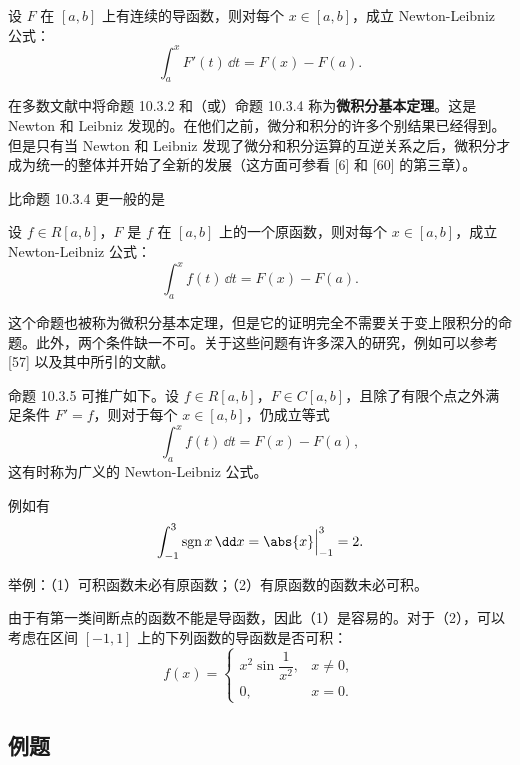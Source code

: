 \begin{xtheorem}[10.3.4（微积分基本公式）]
设 $F$ 在 $[a,b]$ 上有连续的导函数，则对每个 $x\in[a,b]$，成立 Newton-Leibniz 公式：
\[
  \int_a^x F'(t)\,\dd t=F(x)-F(a).
\]
\end{xtheorem}

在多数文献中将命题 10.3.2 和（或）命题 10.3.4 称为\textbf{微积分基本定理}。这是 Newton 和 Leibniz 发现的。在他们之前，微分和积分的许多个别结果已经得到。但是只有当 Newton 和 Leibniz 发现了微分和积分运算的互逆关系之后，微积分才成为统一的整体并开始了全新的发展（这方面可参看 [6] 和 [60] 的第三章）。

比命题 10.3.4 更一般的是

\begin{xtheorem}[10.3.5]
设 $f\in R[a,b]$，$F$ 是 $f$ 在 $[a,b]$ 上的一个原函数，则对每个 $x\in[a,b]$，成立 Newton-Leibniz 公式：
\[
  \int_a^x f(t)\,\dd t=F(x)-F(a).
\]
\end{xtheorem}

\begin{xremark}
这个命题也被称为微积分基本定理，但是它的证明完全不需要关于变上限积分的命题。此外，两个条件缺一不可。关于这些问题有许多深入的研究，例如可以参考 [57] 以及其中所引的文献。
\end{xremark}

\begin{xremark}
命题 10.3.5 可推广如下。设 $f\in R[a,b]$，$F\in C[a,b]$，且除了有限个点之外满足条件 $F'=f$，则对于每个 $x\in[a,b]$，仍成立等式
\[
  \int_a^x f(t)\,\dd t=F(x)-F(a),
\]
这有时称为广义的 Newton-Leibniz 公式。

例如有
\[
  \int_{-1}^3\operatorname{sgn}x\,\dd x=\abs{x}\Big|_{-1}^3=2.
\]
\end{xremark}

\begin{xthought}
举例：（1）可积函数未必有原函数；（2）有原函数的函数未必可积。
\end{xthought}

\begin{xremark}
由于有第一类间断点的函数不能是导函数，因此（1）是容易的。对于（2），可以考虑在区间 $[-1,1]$ 上的下列函数的导函数是否可积：
\[
  f(x)=
  \begin{cases}
    x^2\sin\dfrac1{x^2},&x\ne0,\\
    0,&x=0.
  \end{cases}
\]
\end{xremark}

\subsection{例题}

